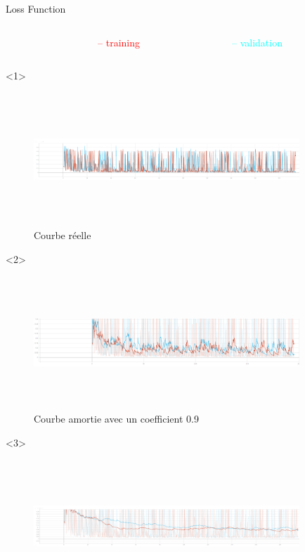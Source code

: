 \documentclass{beamer}
\newcommand{\rouge}{\textcolor{red}}
\begin{document}
\begin{frame}[t]{Loss Function}
  \begin{columns}
    \begin{column}[T]{0.01\textwidth}
    \end{column}
    \hfill
    \begin{column}[T]{0.2\textwidth}
      \rouge{-- training}
    \end{column}
    \begin{column}[T]{0.5\textwidth}
      \textcolor{cyan}{-- validation}
    \end{column}
  \end{columns}

  \begin{onlyenv}<1>
    \begin{figure}
      \includegraphics[width=10cm, height=5cm]{annex/loss_not_smoothed}
      \caption{Courbe réelle}
      \label{courbe}
    \end{figure}
  \end{onlyenv}
  \begin{onlyenv}<2>
    \begin{figure}
      \includegraphics[width=10cm, height=5cm]{annex/loss_smoothed_09}
      \caption{Courbe amortie avec un coefficient 0.9}
      \label{courbe}
    \end{figure}
  \end{onlyenv}
  \begin{onlyenv}<3>
    \begin{figure}
      \includegraphics[width=10cm, height=5cm]{annex/loss_smoothed_099}

\end{figure}
\end{onlyenv}
\end{frame}
\end{document}
